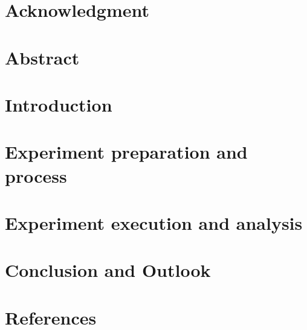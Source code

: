 \documentclass[
	english,
	ruledheaders=section,%
	class=report,%
	thesis={type=master},%
	accentcolor=9c,%
	custommargins=false,%
	marginpar=false,%
	parskip=half-,%
	fontsize=11pt,%
]{tudapub}
\begin{document}
\chapter*{Acknowledgment}



\chapter*{Abstract}



\tableofcontents

\chapter{Introduction}

	
	
\chapter{Experiment preparation and process}

	
	
\chapter{Experiment execution and analysis}

	
	

	
\chapter{Conclusion and Outlook}

	

\chapter{References}
\printbibliography[heading=none]
\end{document}
